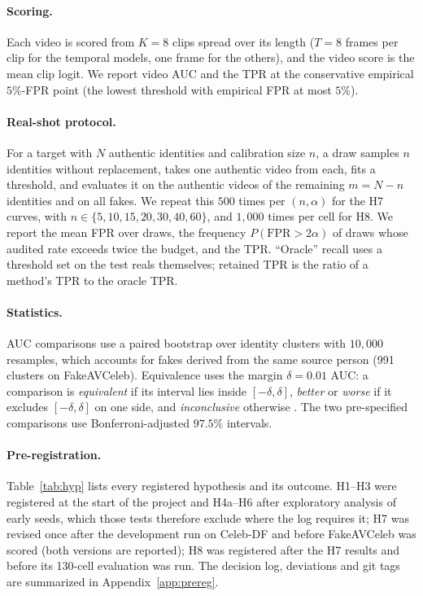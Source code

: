 \paragraph{Scoring.}
Each video is scored from $K=8$ clips spread over its length ($T=8$ frames per clip for the temporal models, one frame for the others), and the video score is the mean clip logit. We report video AUC and the TPR at the conservative empirical $5\%$-FPR point (the lowest threshold with empirical FPR at most $5\%$).

\paragraph{Real-shot protocol.}
For a target with $N$ authentic identities and calibration size $n$, a draw samples $n$ identities without replacement, takes one authentic video from each, fits a threshold, and evaluates it on the authentic videos of the remaining $m=N-n$ identities and on all fakes. We repeat this $500$ times per $(n,\alpha)$ for the H7 curves, with $n\in\{5,10,15,20,30,40,60\}$, and $1{,}000$ times per cell for H8. We report the mean FPR over draws, the frequency $P(\mathrm{FPR}>2\alpha)$ of draws whose audited rate exceeds twice the budget, and the TPR. ``Oracle'' recall uses a threshold set on the test reals themselves; retained TPR is the ratio of a method's TPR to the oracle TPR.

\paragraph{Statistics.}
AUC comparisons use a paired bootstrap over identity clusters \citep{field2007bootstrapping} with $10{,}000$ resamples, which accounts for fakes derived from the same source person (991 clusters on FakeAVCeleb). Equivalence uses the margin $\delta=0.01$ AUC: a comparison is \emph{equivalent} if its interval lies inside $[-\delta,\delta]$, \emph{better} or \emph{worse} if it excludes $[-\delta,\delta]$ on one side, and \emph{inconclusive} otherwise \citep{schuirmann1987comparison}. The two pre-specified comparisons use Bonferroni-adjusted $97.5\%$ intervals.

\paragraph{Pre-registration.}
Table~\ref{tab:hyp} lists every registered hypothesis and its outcome. H1--H3 were registered at the start of the project and H4a--H6 after exploratory analysis of early seeds, which those tests therefore exclude where the log requires it; H7 was revised once after the development run on Celeb-DF and before FakeAVCeleb was scored (both versions are reported); H8 was registered after the H7 results and before its 130-cell evaluation was run. The decision log, deviations and git tags are summarized in Appendix~\ref{app:prereg}.

